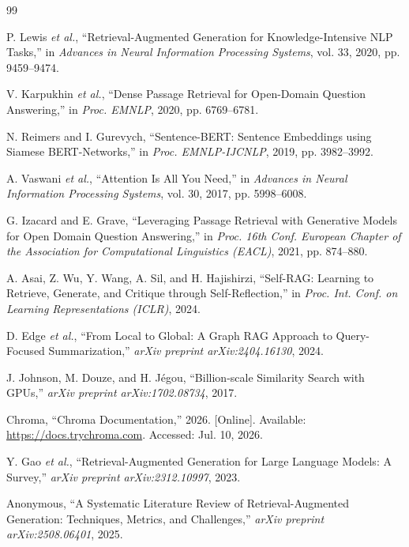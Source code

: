 \documentclass[conference]{IEEEtran}
\begin{document}
\balance
\begin{thebibliography}{99}

 P. Lewis \emph{et al.}, ``Retrieval-Augmented Generation for Knowledge-Intensive NLP Tasks,'' in \emph{Advances in Neural Information Processing Systems}, vol. 33, 2020, pp. 9459--9474.

 V. Karpukhin \emph{et al.}, ``Dense Passage Retrieval for Open-Domain Question Answering,'' in \emph{Proc. EMNLP}, 2020, pp. 6769--6781.

 N. Reimers and I. Gurevych, ``Sentence-BERT: Sentence Embeddings using Siamese BERT-Networks,'' in \emph{Proc. EMNLP-IJCNLP}, 2019, pp. 3982--3992.

 A. Vaswani \emph{et al.}, ``Attention Is All You Need,'' in \emph{Advances in Neural Information Processing Systems}, vol. 30, 2017, pp. 5998--6008.

 G. Izacard and E. Grave, ``Leveraging Passage Retrieval with Generative Models for Open Domain Question Answering,'' in \emph{Proc. 16th Conf. European Chapter of the Association for Computational Linguistics (EACL)}, 2021, pp. 874--880.

 A. Asai, Z. Wu, Y. Wang, A. Sil, and H. Hajishirzi, ``Self-RAG: Learning to Retrieve, Generate, and Critique through Self-Reflection,'' in \emph{Proc. Int. Conf. on Learning Representations (ICLR)}, 2024.

 D. Edge \emph{et al.}, ``From Local to Global: A Graph RAG Approach to Query-Focused Summarization,'' \emph{arXiv preprint arXiv:2404.16130}, 2024.

 J. Johnson, M. Douze, and H. J\'egou, ``Billion-scale Similarity Search with GPUs,'' \emph{arXiv preprint arXiv:1702.08734}, 2017.

 Chroma, ``Chroma Documentation,'' 2026. [Online]. Available: \url{https://docs.trychroma.com}. Accessed: Jul. 10, 2026.

 Y. Gao \emph{et al.}, ``Retrieval-Augmented Generation for Large Language Models: A Survey,'' \emph{arXiv preprint arXiv:2312.10997}, 2023.

 Anonymous, ``A Systematic Literature Review of Retrieval-Augmented Generation: Techniques, Metrics, and Challenges,'' \emph{arXiv preprint arXiv:2508.06401}, 2025.


\end{thebibliography}
\end{document}
